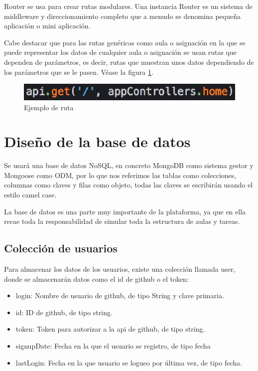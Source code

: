 Router se usa para crear rutas modulares. Una instancia Router es un sistema de middleware y direccionamiento completo que a menudo se denomina pequeña aplicación o mini aplicación.

Cabe destacar que para las rutas genéricas como aula o asignación en la que se puede representar los datos de cualquier aula o asignación se usan rutas que dependen de parámetros, es decir, rutas que muestran unos datos dependiendo de los parámetros que se le pasen.
Véase la figura \ref{fig:Ejemplo de ruta}.

\begin{figure}[!th]
\begin{center}
\includegraphics[scale=1.0]{images/ruta}
\caption{Ejemplo de ruta}
\label{fig:Ejemplo de ruta}
\end{center}
\end{figure}


\section{Diseño de la base de datos}
\label{:sec4}

Se usará una base de datos NoSQL, en concreto MongoDB como sistema gestor y Mongoose como ODM, por lo que nos referimos las tablas como colecciones, columnas como claves y filas como objeto, todas las claves se escribirán usando el estilo camel case.

La base de datos es una parte muy importante de la plataforma, ya que en ella recae toda la responsabilidad de simular toda la estructura de aulas y tareas.

\subsection{Colección de usuarios}
\label{3:4:1}

Para almacenar los datos de los usuarios, existe una colección llamada user, donde se almacenarán datos como el id de github o el token:

\begin{itemize}
  \item login: Nombre de usuario de github, de tipo String y clave primaria.
  \item id: ID de github, de tipo string.
  \item token: Token para autorizar a la api de github, de tipo string.
  \item signupDate: Fecha en la que el usuario se registro, de tipo fecha
  \item lastLogin: Fecha en la que usuario se logueo por última vez, de tipo fecha.
\end{itemize}

